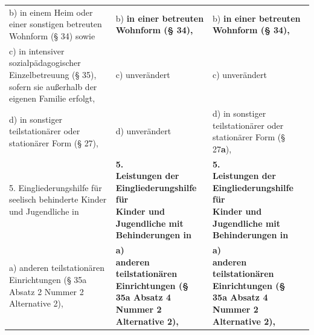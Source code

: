 \documentclass[10pt,a4paper,landscape]{article}
\begin{document}
\begin{longtable}{|L{8.2cm}|L{8.2cm}|L{8.2cm}|}
\hhline{|---|}
b)  \newline in \textcolor{diffred}{einem Heim oder} einer \textcolor{diffred}{sonstigen}  \newline betreuten Wohnform (\S{} \textcolor{diffred}{34) sowie} & b)   \newline \textbf{in einer betreuten Wohnform (\S{} 34), } & b)   \newline \textbf{in einer betreuten Wohnform (\S{} 34), } \\
\hhline{|---|}
c)  \newline in intensiver sozialpädagogischer  \newline Einzelbetreuung (\S{} 35), sofern sie  \newline außerhalb der eigenen Familie erfolgt, & c) unverändert & c) unverändert \\
\hhline{|---|}
d)  \newline in sonstiger teilstationärer oder stationärer  \newline Form (\S{} \textcolor{diffred}{27),} & d) unverändert & d)  in sonstiger teilstationärer oder stationärer  \newline Form (\S{} \textcolor{diffgreen}{27}\textbf{\textcolor{diffgreen}{a}}\textcolor{diffgreen}{),} \\
\hhline{|---|}
5.  \newline Eingliederungshilfe für \textcolor{diffred}{seelisch behinderte}  \newline Kinder und Jugendliche in & \textbf{5.  \newline Leistungen der Eingliederungshilfe für  \newline Kinder und Jugendliche mit  \newline Behinderungen in } & \textbf{5.  \newline Leistungen der Eingliederungshilfe für  \newline Kinder und Jugendliche mit  \newline Behinderungen in } \\
\hhline{|---|}
a)  \newline anderen teilstationären Einrichtungen (\S{}  \newline 35a Absatz \textcolor{diffred}{2} Nummer 2 Alternative 2), & \textbf{a)  \newline anderen teilstationären Einrichtungen (\S{}  \newline 35a Absatz 4 Nummer 2 Alternative 2), } & \textbf{a)  \newline anderen teilstationären Einrichtungen (\S{}  \newline 35a Absatz 4 Nummer 2 Alternative 2), } \\

\end{longtable}
\end{document}
